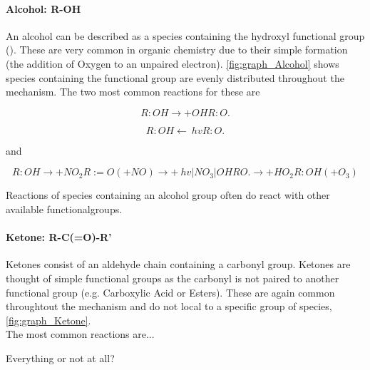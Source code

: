 \paragraph{Alcohol: R-OH}



An alcohol can be described as a species containing the hydroxyl functional group (). These are very common in organic chemistry due to their simple formation (the addition of Oxygen to an unpaired electron). \autoref{fig:graph_Alcohol} shows species containing the functional group are evenly distributed throughout the mechanism. The two most common reactions for these are

\begin{equation*}
R:OH \rightarrow{{+OH}} R:O.
\end{equation*}

\begin{equation*}
R:OH \leftarrow{~hv} R:O.
\end{equation*}

and

\begin{equation*}
R:OH \rightarrow{{+NO_2}} R:=O (+NO)  \rightarrow{{+ ~hv|NO_3|OH}} RO.  \rightarrow{{+HO_2}} R:OH (+O_3)
\end{equation*}

Reactions of species containing an alcohol group often do react with other available functionalgroups.


\paragraph{Ketone: R-C(=O)-R'}
Ketones consist of an aldehyde chain containing a carbonyl group. Ketones are thought of simple functional groups as the carbonyl is not paired to another functional group (e.g. Carboxylic Acid or Esters). These are again common throughtout the mechanism and do not local to a specific group of species, \autoref{fig:graph_Ketone}. \\

The most common reactions are...

Everything or not at all?


